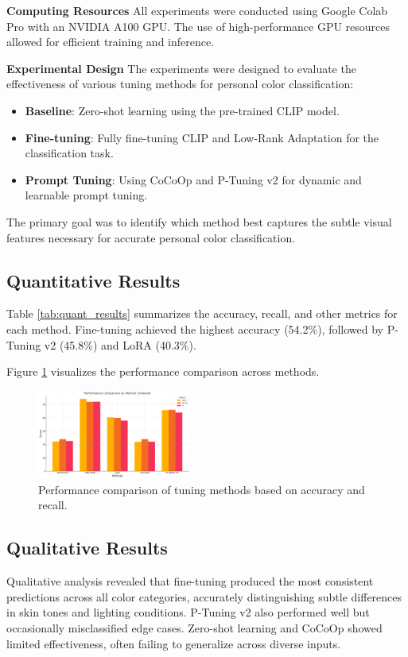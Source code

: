 \documentclass[twocolumn]{article}
\begin{document}
\textbf{Computing Resources}
All experiments were conducted using Google Colab Pro with an NVIDIA A100 GPU. The use of high-performance GPU resources allowed for efficient training and inference.

\textbf{Experimental Design}
The experiments were designed to evaluate the effectiveness of various tuning methods for personal color classification:

\begin{itemize}
\item \textbf{Baseline}: Zero-shot learning using the pre-trained CLIP model.
\item \textbf{Fine-tuning}: Fully fine-tuning CLIP and Low-Rank Adaptation for the classification task.
\item \textbf{Prompt Tuning}: Using CoCoOp and P-Tuning v2 for dynamic and learnable prompt tuning.
\end{itemize}

The primary goal was to identify which method best captures the subtle visual features necessary for accurate personal color classification.

\subsection{Quantitative Results}
Table \ref{tab:quant_results} summarizes the accuracy, recall, and other metrics for each method. Fine-tuning achieved the highest accuracy (54.2\%), followed by P-Tuning v2 (45.8\%) and LoRA (40.3\%).

Figure \ref{fig:performance_comparison} visualizes the performance comparison across methods.

\begin{figure}[h]
\centering
\includegraphics[width=0.45\textwidth]{Figure_Final_Project/DL_Project_chart.png}
\caption{Performance comparison of tuning methods based on accuracy and recall.}
\label{fig:performance_comparison}
\end{figure}

\subsection{Qualitative Results}
Qualitative analysis revealed that fine-tuning produced the most consistent predictions across all color categories, accurately distinguishing subtle differences in skin tones and lighting conditions. P-Tuning v2 also performed well but occasionally misclassified edge cases. Zero-shot learning and CoCoOp showed limited effectiveness, often failing to generalize across diverse inputs.
\end{document}
